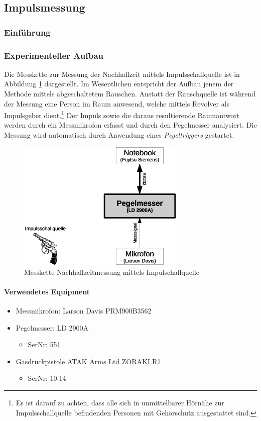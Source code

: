 \documentclass[11pt]{report}
\begin{document}
\subsection{Impulsmessung}
\subsubsection{Einf\"uhrung}
\label{Impulseinfuehrung}
\subsubsection{Experimenteller Aufbau}
Die Messkette zur Messung der Nachhallzeit mittels Impulsschallquelle ist in Abbildung \ref{fig:impulsaufbau} dargestellt. Im Wesentlichen entspricht der Aufbau jenem der Methode mittels abgeschaltetem Rauschen. Anstatt der Rauschquelle ist w\"ahrend der Messung eine Person im Raum anwesend, welche mittels Revolver als Impulsgeber dient.\footnote{Es ist darauf zu achten, dass alle sich in unmittelbarer H\"orn\"ahe zur Impulsschallquelle befindenden Personen mit Geh\"orschutz ausgestattet sind.} Der Impuls sowie die daraus resultierende Raumantwort werden durch ein Messmikrofon erfasst und durch den Pegelmesser analysiert. Die Messung wird automatisch durch Anwendung eines \textit{Pegeltriggers} gestartet. 
\begin{figure}[htbp]
\begin{center}
\includegraphics[width=8cm,keepaspectratio=true]{impulsaufbau}
\caption{Messkette Nachhallzeitmessung mittels Impulschallquelle}
\label{fig:impulsaufbau}
\end{center}
\end{figure}
\paragraph{Verwendetes Equipment}
\begin{itemize}
\item Messmikrofon: Larson Davis PRM900B3562
\item Pegelmesser: LD 2900A
\begin{itemize}
\item SerNr: 551
\end{itemize}
\item Gasdruckpistole ATAK Arms Ltd ZORAKI.R1
\begin{itemize}
\item SerNr: 10.14
\end{itemize}
\end{itemize}
\end{document}
